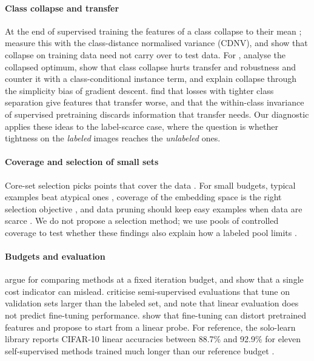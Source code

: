 \paragraph{Class collapse and transfer}
At the end of supervised training the features of a class collapse to their mean
\citep{papyan2020neural}; \citet{galanti2022role} measure this with the class-distance normalised variance
(CDNV), and \citet{hui2022limitations} show that collapse on training data need not carry over to test data.
For \supcon, \citet{graf2021dissecting} analyse the collapsed optimum, \citet{chen2022perfectly} show that
class collapse hurts transfer and robustness and counter it with a class-conditional instance term, and
\citet{xue2023which} explain collapse through the simplicity bias of gradient descent.
\citet{kornblith2021better} find that losses with tighter class separation give features that transfer worse,
and \citet{zhao2021what} that the within-class invariance of supervised pretraining discards information
that transfer needs. Our diagnostic applies these ideas to the label-scarce case, where the question is
whether tightness on the \emph{labeled} images reaches the \emph{unlabeled} ones.

\paragraph{Coverage and selection of small sets}
Core-set selection picks points that cover the data \citep{sener2018coreset}. For small budgets, typical
examples beat atypical ones \citep{hacohen2022active}, coverage of the embedding space is the right
selection objective \citep{yehuda2022active}, and data pruning should keep easy examples when data are
scarce \citep{sorscher2022beyond,zheng2023coverage}. We do not propose a selection method; we use pools of
controlled coverage to test whether these findings also explain how a labeled pool limits \supcon.

\paragraph{Budgets and evaluation}
\citet{li2020budgeted} argue for comparing methods at a fixed iteration budget, and
\citet{dehghani2022efficiency} show that a single cost indicator can mislead.
\citet{oliver2018realistic} criticise semi-supervised evaluations that tune on validation sets larger than
the labeled set, and \citet{newell2020useful} note that linear evaluation does not predict fine-tuning
performance. \citet{kumar2022lpft} show that fine-tuning can distort pretrained features and propose to
start from a linear probe. For reference, the solo-learn library reports CIFAR-10 linear accuracies between
88.7\% and 92.9\% for eleven self-supervised methods trained much longer than our reference budget
\citep[Table~1]{dacosta2022sololearn}.

